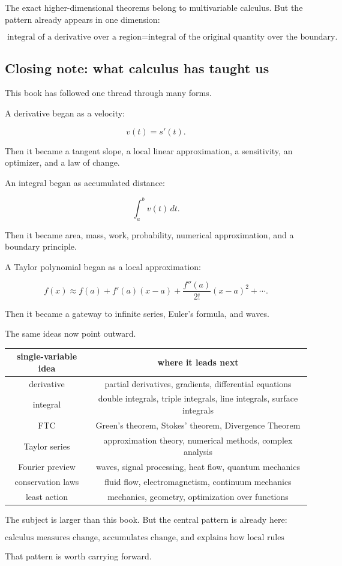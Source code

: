 The exact higher-dimensional theorems belong to multivariable calculus.  But the pattern
already appears in one dimension:

\[
\boxed{
\text{integral of a derivative over a region}
=
\text{integral of the original quantity over the boundary.}
}
\]

\subsection{Closing note: what calculus has taught us}
\label{subsec:closing-note-calculus}

This book has followed one thread through many forms.

A derivative began as a velocity:

\[
v(t)=s'(t).
\]

Then it became a tangent slope, a local linear approximation, a sensitivity, an optimizer,
and a law of change.

An integral began as accumulated distance:

\[
\int_a^b v(t)\,dt.
\]

Then it became area, mass, work, probability, numerical approximation, and a boundary
principle.

A Taylor polynomial began as a local approximation:

\[
f(x)\approx
f(a)+f'(a)(x-a)+\frac{f''(a)}{2!}(x-a)^2+\cdots.
\]

Then it became a gateway to infinite series, Euler's formula, and waves.

The same ideas now point outward.

\begin{center}
\renewcommand{\arraystretch}{1.35}
\begin{tabular}{c|c}
\textbf{single-variable idea} & \textbf{where it leads next} \\ \hline
derivative & partial derivatives, gradients, differential equations \\
integral & double integrals, triple integrals, line integrals, surface integrals \\
FTC & Green's theorem, Stokes' theorem, Divergence Theorem \\
Taylor series & approximation theory, numerical methods, complex analysis \\
Fourier preview & waves, signal processing, heat flow, quantum mechanics \\
conservation laws & fluid flow, electromagnetism, continuum mechanics \\
least action & mechanics, geometry, optimization over functions
\end{tabular}
\end{center}

The subject is larger than this book.  But the central pattern is already here:

\[
\boxed{
\text{calculus measures change, accumulates change, and explains how local rules shape global behavior.}
}
\]

That pattern is worth carrying forward.